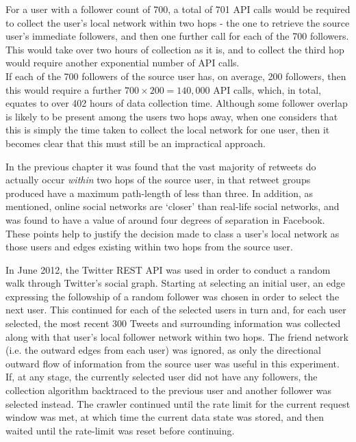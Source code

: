 For a user with a follower count of 700, a total of 701 API calls would be required to collect the user's local network within two hops - the one to retrieve the source user's immediate followers, and then one further call for each of the 700 followers. This would take over two hours of collection as it is, and to collect the third hop would require another exponential number of API calls.\\
If each of the 700 followers of the source user has, on average, 200 followers, then this would require  a further $700 \times 200 = 140,000$ API calls, which, in total, equates to over 402 hours of data collection time. Although some follower overlap is likely to be present among the users two hops away, when one considers that this is simply the time taken to collect the local network for one user, then it becomes clear that this must still be an impractical approach.

In the previous chapter it was found that the vast majority of retweets do actually occur \textit{within} two hops of the source user, in that retweet groups produced have a maximum path-length of less than three. In addition, as mentioned, online social networks are `closer' than real-life social networks, and was found to have a value of around four degrees of separation in Facebook. These points help to justify the decision made to class a user's local network as those users and edges existing within two hops from the source user.

In June 2012, the Twitter REST API was used in order to conduct a random walk through Twitter's social graph. Starting at selecting an initial user, an edge expressing the followship of a random follower was chosen in order to select the next user. This continued for each of the selected users in turn and, for each user selected, the most recent 300 Tweets and surrounding information was collected along with that user's local follower network within two hops. The friend network (i.e. the outward edges from each user) was ignored, as only the directional outward flow of information from the source user was useful in this experiment.\\
If, at any stage, the currently selected user did not have any followers, the collection algorithm backtraced to the previous user and another follower was selected instead. The crawler continued until the rate limit for the current request window was met, at which time the current data state was stored, and then waited until the rate-limit was reset before continuing.

